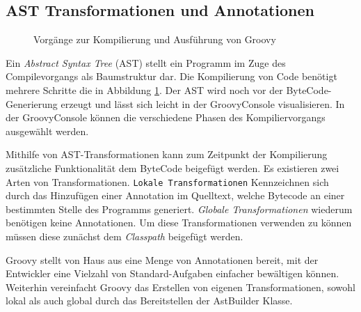 \subsection{AST Transformationen und Annotationen}

\begin{figure}[hbt]
	\centering
	
	\caption{Vorgänge zur Kompilierung und Ausführung von Groovy \cite{groovy-in-action}}
	\label{fig:groovy-compile-steps}
\end{figure}

Ein \textit{Abstract Syntax Tree} (AST) stellt ein Programm im Zuge des Compilevorgangs als Baumstruktur dar. 
Die Kompilierung von Code benötigt mehrere Schritte die in Abbildung \ref{fig:groovy-compile-steps}. 
Der AST wird noch vor der ByteCode-Generierung erzeugt und lässt sich leicht in der GroovyConsole visualisieren. 
In der GroovyConsole können die verschiedene Phasen des Kompiliervorgangs ausgewählt werden. 

Mithilfe von AST-Transformationen kann zum Zeitpunkt der Kompilierung zusätzliche Funktionalität dem ByteCode beigefügt werden.
Es existieren zwei Arten von Transformationen. \texttt{Lokale Transformationen} Kennzeichnen sich durch das Hinzufügen einer Annotation im Quelltext, welche Bytecode an einer bestimmten Stelle des Programms generiert. \textit{Globale Transformationen} wiederum benötigen keine Annotationen.
Um diese Transformationen verwenden zu können müssen diese zunächst dem \textit{Classpath} beigefügt werden.

Groovy stellt von Haus aus eine Menge von Annotationen bereit, mit der Entwickler eine Vielzahl von Standard-Aufgaben einfacher bewältigen können. Weiterhin vereinfacht Groovy das Erstellen von eigenen Transformationen, sowohl lokal als auch global durch das Bereitstellen der AstBuilder Klasse.
